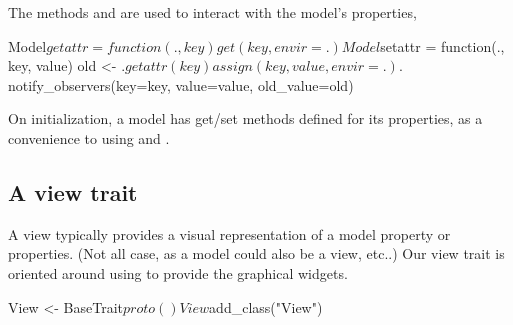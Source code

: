 \documentclass{memoir}
\begin{document}
The methods  and  are used to interact
with the model's properties,
\begin{Schunk}
\begin{Sinput}
 Model$getattr = function(., key) get(key, envir=.)
 Model$setattr = function(., key, value) {
   old <- .$getattr(key)
   assign(key, value, envir=.)
   .$notify_observers(key=key, value=value, old_value=old)
 }
\end{Sinput}
\end{Schunk}

On initialization, a model has get/set methods defined for its
properties, as a convenience to using  and .
\begin{Schunk}
\end{Schunk}

\subsection{A view trait}
\label{sec:view-trait}

A view typically provides a visual representation of a model property or
properties. (Not all case, as a model could also be a view, etc..) Our
view trait is oriented around using  to provide the
graphical widgets.

\begin{Schunk}
\begin{Sinput}
 View <- BaseTrait$proto()
 View$add_class("View")
\end{Sinput}
\end{Schunk}
\end{document}
